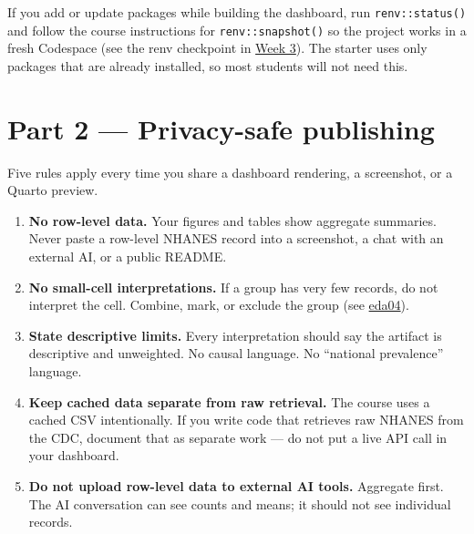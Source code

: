 \documentclass[
  letterpaper,
  DIV=11,
  numbers=noendperiod,
  oneside]{scrreprt}
\providecommand{\tightlist}{%
  \setlength{\itemsep}{0pt}\setlength{\parskip}{0pt}}
\begin{document}
\begin{tcolorbox}[enhanced jigsaw, title=\textcolor{quarto-callout-tip-color}{\faLightbulb}\hspace{0.5em}{Package check before you finish}, arc=.35mm, toptitle=1mm, colframe=quarto-callout-tip-color-frame, toprule=.15mm, leftrule=.75mm, bottomtitle=1mm, opacityback=0, bottomrule=.15mm, coltitle=black, breakable, opacitybacktitle=0.6, titlerule=0mm, colback=white, left=2mm, colbacktitle=quarto-callout-tip-color!10!white, rightrule=.15mm]

If you add or update packages while building the dashboard, run
\texttt{renv::status()} and follow the course instructions for
\texttt{renv::snapshot()} so the project works in a fresh Codespace (see
the renv checkpoint in \hyperref[week-3-r-with-ai-1]{Week 3}). The
starter uses only packages that are already installed, so most students
will not need this.

\end{tcolorbox}

\section*{Part 2 --- Privacy-safe
publishing}\label{part-2-privacy-safe-publishing}


Five rules apply every time you share a dashboard rendering, a
screenshot, or a Quarto preview.

\begin{enumerate}
\def\labelenumi{\arabic{enumi}.}
\tightlist
\item
  \textbf{No row-level data.} Your figures and tables show aggregate
  summaries. Never paste a row-level NHANES record into a screenshot, a
  chat with an external AI, or a public README.
\item
  \textbf{No small-cell interpretations.} If a group has very few
  records, do not interpret the cell. Combine, mark, or exclude the
  group (see \hyperref[what-each-statistic-claims-and-does-not]{eda04}).
\item
  \textbf{State descriptive limits.} Every interpretation should say the
  artifact is descriptive and unweighted. No causal language. No
  ``national prevalence'' language.
\item
  \textbf{Keep cached data separate from raw retrieval.} The course uses
  a cached CSV intentionally. If you write code that retrieves raw
  NHANES from the CDC, document that as separate work --- do not put a
  live API call in your dashboard.
\item
  \textbf{Do not upload row-level data to external AI tools.} Aggregate
  first. The AI conversation can see counts and means; it should not see
  individual records.
\end{enumerate}
\end{document}

